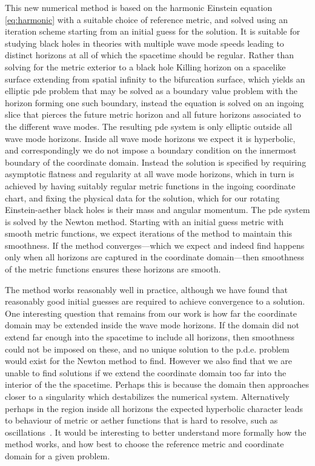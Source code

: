 \documentclass[12pt]{article}
\numberwithin{equation}{section}
\begin{document}
This new numerical method is  based on the harmonic Einstein equation \eqref{eq:harmonic} with a suitable choice of reference metric, and
solved using an iteration scheme starting from an initial guess for the solution. It is suitable for studying black holes in theories with multiple wave mode speeds
leading to distinct horizons at all of which the spacetime should be regular.
Rather than solving for the metric exterior to a black hole Killing horizon on a spacelike surface extending from spatial infinity to the bifurcation surface, which yields an elliptic pde problem that may be solved as a boundary value problem with the horizon forming one such boundary, instead the equation is solved on an ingoing slice that pierces the future metric horizon and all future horizons associated to the different wave modes. The resulting pde system is only elliptic outside all wave mode horizons. Inside all wave mode horizons we expect it is hyperbolic, and correspondingly we do not impose a boundary condition on the innermost boundary of the coordinate domain.
Instead the solution is specified by requiring asymptotic flatness and regularity at all wave mode horizons, which in turn is achieved by having suitably regular metric functions in the ingoing coordinate chart, 
and 
fixing
the physical data for the solution, which for our rotating Einstein-aether black holes is their mass and angular momentum.
The pde system is solved by the Newton method. Starting with an initial guess metric with smooth metric functions, we expect iterations of the method to maintain this smoothness. If the method converges---which we expect and indeed find happens only when all horizons are captured in the coordinate domain---then smoothness of the metric functions ensures these horizons are smooth.

The method works reasonably well in practice, although we have found that reasonably good initial guesses are required to achieve convergence to a solution.
One interesting question that remains from our work is how far the coordinate domain may be extended inside the wave mode horizons. 
If the domain did not extend far enough into the spacetime to include all horizons, then smoothness could not be imposed on these, and no unique solution to the p.d.e. problem would exist for the Newton method to find.
However we also find that we are unable to find solutions if we extend the coordinate domain too far into the interior of the the spacetime. Perhaps this is because the domain then approaches closer to a singularity which destabilizes the numerical system. Alternatively perhaps in the region inside all horizons the expected hyperbolic character leads to behaviour of metric or aether functions that is hard to resolve, such as oscillations~\cite{Eling:2006ec,Barausse:2011pu}.
It would be interesting to better understand more formally 
how the method works, and how best to choose the reference metric and coordinate domain for a given problem.
\end{document}
